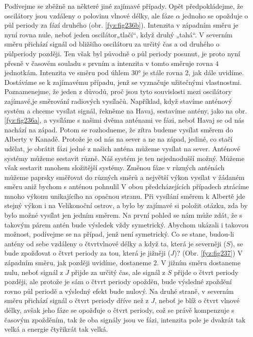     Podívejme se zběžně na některé jiné zajímavé případy. Opět předpokládejme, že oscilátory jsou 
    vzdáleny o polovinu vlnové délky, ale fáze \(\alpha\) jednoho se opožduje o půl periody za fází 
    druhého (obr. \ref{fyz:fig236b}). Intenzita v západním směru je nyní rovna nule, neboť jeden 
    oscilátor„tlačí“, když druhý „tahá“. V severním směru přichází signál od bližšího oscilátoru za 
    určitý čas a od druhého o půlperiody později. Ten však byl původně o půl periody posunut, je 
    proto nyní přesně v časovém souladu s prvním a intenzita v tomto směruje rovna \(4\) jednotkám. 
    Intenzita ve směru pod úhlem \ang{30} je stále rovna \(2\), jak dále uvidíme. Dostáváme se k 
    zajímavému případu, jenž se vyznačuje užitečnými vlastnostmi. Poznamenejme, že jeden z důvodů, 
    proč jsou tyto souvislosti mezi oscilátory zajímavé,je směrování radiových vysílačů. Například, 
    když stavíme anténový systém a chceme vysílat signál, řekněme na Havaj, sestavíme antény, jako 
    na obr. \ref{fyz:fig236a}, a vysíláme s našimi dvěma anténami ve fázi, neboť Havaj se od nás 
    nachází na západ. Potom se rozhodneme, že zítra budeme vysílat směrem do Alberty v Kanadě. 
    Protože je od nás na sever a ne na západ, jediné, co stačí udělat, je obrátit fázi jedné z 
    našich anténa můžeme vysílat na sever. Anténové systémy můžeme sestavit různě. Náš systém je 
    ten nejednodušší možný. Můžeme však sestavit mnohem složitější systémy. Změnou fáze v různých 
    anténách můžeme paprsky směřovat do různých směrů a největší výkon vysílat v žádaném směru aniž 
    bychom s anténou pohnulil V obou předcházejících případech ztrácíme mnoho výkonu unikajícího na 
    opačnou stranu. Při vysílání směrem k Albertě jde stejný výkon i na Velikonoční ostrov, a bylo 
    by zajímavé si položit otázku, zda by bylo možné vysílat jen jedním směrem. Na první pohled se 
    nám může zdát, že s takovým párem antén bude výsledek vždy symetrický. Abychom ukázali i 
    takovou možnost, podívejme se na případ, jenž není symetrický. Co se stane, budou-li antény od 
    sebe vzdáleny o čtvrtvlnové délky a když ta, která je severněji (\(S\)), se bude zpožďovat o 
    čtvrt periody za tou, která je jižněji (\(J\))? (Obr. \ref{fyz:fig237}) V západním směru, jak 
    později uvidíme, dostaneme \(2\). V jižním směru dostaneme nulu, neboť signál z \(J\) přijde za 
    určitý čas, ale signál z \(S\) přijde o čtvrt periody později, ale protože je sám o čtvrt 
    periody opožděn, bude výsledné zpoždění rovno půl periodě a výsledný efekt bude nulový. Na 
    druhé straně, v severním směru přichází signál o čtvrt periody dříve než z \(J\), neboť je blíž 
    o čtvrt vlnové délky, avšak jeho fáze se opožďuje o čtvrt periody, což se právě kompenzuje s 
    časovým zpožděním, tak že oba signály jsou ve fázi, intenzita pole je dvakrát tak velká a 
    energie čtyřikrát tak velká.

